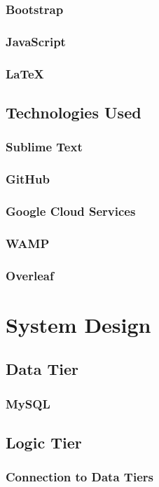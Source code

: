 \subsection{Bootstrap}
\subsection{JavaScript}
\subsection{LaTeX}

\section{Technologies Used}
\subsection{Sublime Text}
\subsection{GitHub}
\subsection{Google Cloud Services}
\subsection{WAMP}
\subsection{Overleaf}

\chapter{System Design}

\section{Data Tier}
\subsection{MySQL}

\section{Logic Tier}
\subsection{Connection to Data Tiers}
